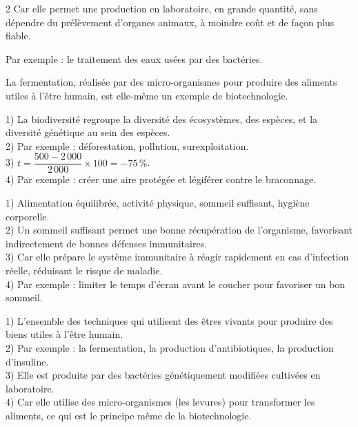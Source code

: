 \begin{multicols}{2}
Car elle permet une production en laboratoire, en grande quantité, sans dépendre du
prélèvement d'organes animaux, à moindre coût et de façon plus fiable.

Par exemple : le traitement des eaux usées par des bactéries.

La fermentation, réalisée par des micro-organismes pour produire des aliments utiles à
l'être humain, est elle-même un exemple de biotechnologie.

1) La biodiversité regroupe la diversité des écosystèmes, des espèces, et la diversité
génétique au sein des espèces.\\
2) Par exemple : déforestation, pollution, surexploitation.\\
3) $t=\dfrac{500-2\,000}{2\,000}\times100=-75\,\%$.\\
4) Par exemple : créer une aire protégée et légiférer contre le braconnage.

1) Alimentation équilibrée, activité physique, sommeil suffisant, hygiène corporelle.\\
2) Un sommeil suffisant permet une bonne récupération de l'organisme, favorisant
indirectement de bonnes défenses immunitaires.\\
3) Car elle prépare le système immunitaire à réagir rapidement en cas d'infection
réelle, réduisant le risque de maladie.\\
4) Par exemple : limiter le temps d'écran avant le coucher pour favoriser un bon
sommeil.

1) L'ensemble des techniques qui utilisent des êtres vivants pour produire des biens
utiles à l'être humain.\\
2) Par exemple : la fermentation, la production d'antibiotiques, la production
d'insuline.\\
3) Elle est produite par des bactéries génétiquement modifiées cultivées en
laboratoire.\\
4) Car elle utilise des micro-organismes (les levures) pour transformer les aliments,
ce qui est le principe même de la biotechnologie.

\end{multicols}
\exercicesBanner
